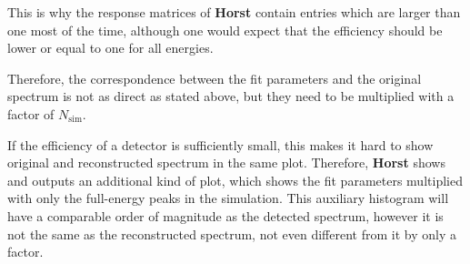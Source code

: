 \documentclass{article}
\begin{document}
This is why the response matrices of \textbf{Horst} contain entries which are larger than one most of the time, although one would expect that the efficiency should be lower or equal to one for all energies.

Therefore, the correspondence between the fit parameters and the original spectrum is not as direct as stated above, but they need to be multiplied with a factor of $N_\mathrm{sim}$.

If the efficiency of a detector is sufficiently small, this makes it hard to show original and reconstructed spectrum in the same plot.
Therefore, \textbf{Horst} shows and outputs an additional kind of plot, which shows the fit parameters multiplied with only the full-energy peaks in the simulation.
This auxiliary histogram will have a comparable order of magnitude as the detected spectrum, however it is not the same as the reconstructed spectrum, not even different from it by only a factor.
\end{document}
